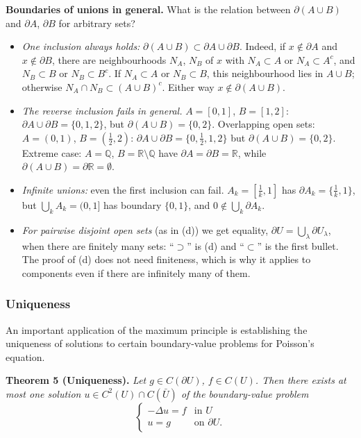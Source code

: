 \documentclass[11pt]{article}
\theoremstyle{plain}
\theoremstyle{definition}
\theoremstyle{remark}
\begin{document}
\textbf{Boundaries of unions in general.} What is the relation between $\partial(A \cup B)$ and $\partial A$, $\partial B$ for arbitrary sets?
\begin{itemize}
    \item \emph{One inclusion always holds:} $\partial(A \cup B) \subset \partial A \cup \partial B$. Indeed, if $x \notin \partial A$ and $x \notin \partial B$, there are neighbourhoods $N_A$, $N_B$ of $x$ with $N_A \subset A$ or $N_A \subset A^c$, and $N_B \subset B$ or $N_B \subset B^c$. If $N_A \subset A$ or $N_B \subset B$, this neighbourhood lies in $A \cup B$; otherwise $N_A \cap N_B \subset (A \cup B)^c$. Either way $x \notin \partial(A \cup B)$.
    \item \emph{The reverse inclusion fails in general.} $A = [0,1]$, $B = [1,2]$: $\partial A \cup \partial B = \{0,1,2\}$, but $\partial(A\cup B) = \{0,2\}$. Overlapping open sets: $A = (0,1)$, $B = (\frac12, 2)$: $\partial A \cup \partial B = \{0, \frac12, 1, 2\}$ but $\partial(A\cup B) = \{0,2\}$. Extreme case: $A = \mathbb{Q}$, $B = \mathbb{R}\setminus\mathbb{Q}$ have $\partial A = \partial B = \mathbb{R}$, while $\partial(A \cup B) = \partial\mathbb{R} = \emptyset$.
    \item \emph{Infinite unions:} even the first inclusion can fail. $A_k = [\frac1k, 1]$ has $\partial A_k = \{\frac1k, 1\}$, but $\bigcup_k A_k = (0,1]$ has boundary $\{0,1\}$, and $0 \notin \bigcup_k\partial A_k$.
    \item \emph{For pairwise disjoint open sets} (as in (d)) we get equality, $\partial U = \bigcup_\lambda \partial U_\lambda$, when there are finitely many sets: ``$\supset$'' is (d) and ``$\subset$'' is the first bullet. The proof of (d) does not need finiteness, which is why it applies to components even if there are infinitely many of them.
\end{itemize}

\subsubsection{Uniqueness}
An important application of the maximum principle is establishing the uniqueness of solutions to certain boundary-value problems for Poisson's equation.

\textbf{Theorem 5 (Uniqueness).} \textit{Let $g \in C(\partial U)$, $f \in C(U)$. Then there exists at most one solution $u \in C^2(U) \cap C(\bar U)$ of the boundary-value problem}
\begin{equation}\label{eq:bvp}
\begin{cases} -\Delta u = f & \text{in } U \\ u = g & \text{on } \partial U. \end{cases}
\end{equation}
\end{document}
